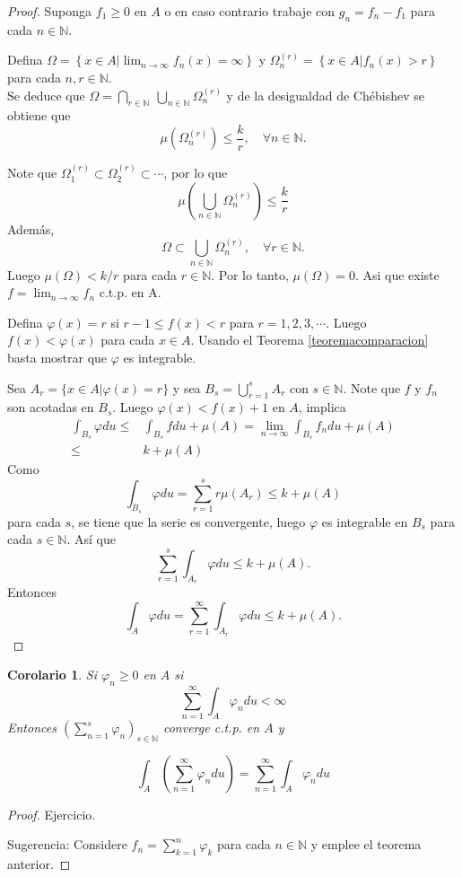 \documentclass[twoside,12pt,a4 paper,openright]{book}
\newtheorem{cor}[claim]{Corolario}
\begin{document}
\begin{proof}
    Suponga $f_1\geq 0$ en $A$ o en caso contrario trabaje con $g_n = f_n - f_1$ para cada $n\in \mathbb N$.
    
    Defina $\displaystyle\Omega = \left\{x\in A | \lim_{n\to\infty} f_n(x) = \infty\right\}$ y 
    $\displaystyle\Omega_n^{(r)} = \left\{x\in A |  f_n(x) > r\right\}$ para cada $n,r\in\mathbb N $. \\
    Se deduce que $\displaystyle\Omega = \bigcap_{r\in\mathbb N} \ \bigcup_{n\in\mathbb N} \Omega_n^{(r)}$ y de la desigualdad de Ch\'ebishev se obtiene  que 
    $$\mu(\Omega_n^{(r)} )\leq \frac{k}{r} ,\quad \forall n\in \mathbb N.$$

    Note que $\Omega_1^{(r)}\subset\Omega_2^{(r)}\subset\cdots$, por lo que 
    $$\mu\left(\bigcup_{n\in\mathbb N} \Omega_n^{(r)}\right)\leq \frac{k}{r}$$
    Adem\'as,
    $$\Omega \subset \bigcup_{n\in\mathbb N} \Omega_n^{(r)},\quad \forall r\in \mathbb N.$$
Luego $\mu(\Omega)<k/r$ para cada $r\in \mathbb N $. Por lo tanto, $\mu(\Omega)=0$.
    Asi que existe\\
    $\displaystyle f = \lim_{n\to\infty} f_n$ c.t.p. en A.

    Defina $\varphi(x) = r$ si $r - 1 \leq f(x) < r$ para $r = 1, 2 , 3, \cdots$. Luego  $f(x) < \varphi(x)$ para cada  $x\in A$. Usando el Teorema \ref{teoremacomparacion}  basta mostrar que $\varphi$ es integrable. 

    Sea $A_r = \{x\in A | \varphi(x) = r\}$ y sea $\displaystyle B_s = \bigcup_{r = 1}^s A_r$ con $s\in \mathbb N$. Note que 	$ f$ y $f_n$ son acotadas en $B_s$. Luego $\varphi(x) < f(x) + 1$ en $A$, implica
    \begin{align*}
        \int_{B_s}\varphi du \leq & \int_{B_s}fdu + \mu(A) = \lim_{n\to \infty}\int_{B_s}f_n du+ \mu(A)\\
        \leq &k + \mu(A)
    \end{align*}
    Como
    $$\int_{B_s}\varphi du = \sum_{r=1}^s r\mu(A_r)\leq k + \mu(A)$$
    para cada $s$, se tiene que la serie es convergente, luego $\varphi$ es integrable
    en  $B_s$ para cada $s\in \mathbb N$. As\'i que  
    $$\sum_{r=1}^s\int_{A_r}\varphi du  \leq k + \mu(A).$$
Entonces 
$$\int_{A}\varphi du = \sum_{r=1}^\infty  \int_{A_r}\varphi du  \leq k + \mu(A).$$
\end{proof}
\begin{cor}
    Si $\varphi_n \geq 0$ en $A$ si 
    $$\sum_{n=1}^\infty \int_A \varphi_n du <\infty $$
    Entonces $(\displaystyle \sum_{n=1}^s \varphi_n)_{s\in\mathbb N}$ converge c.t.p. en $A$ y 

    $$\int_A\left(\sum_{n = 1}^{\infty}\varphi_ndu\right) = \sum_{n=1}^\infty \int_A \varphi_n du$$
\end{cor}
\begin{proof}
Ejercicio.

 Sugerencia: Considere $f_n = \sum_{k = 1}^{n}\varphi_k$ para cada $n\in \mathbb N$ y emplee el teorema anterior.
\end{proof}
\end{document}
